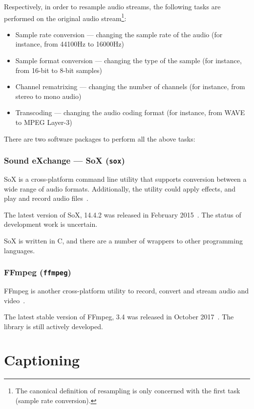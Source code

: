 Respectively, in order to resample audio streams, the following tasks
are performed on the original audio stream\footnote{The canonical
definition of resampling is only concerned with the first task
(sample rate conversion).}:

\begin{itemize}
    \item Sample rate conversion --- changing the sample rate of the audio
    (for instance, from 44100Hz to 16000Hz)
    \item Sample format conversion --- changing the type of the sample
    (for instance, from 16-bit to 8-bit samples)
    \item Channel rematrixing --- changing the number of channels
    (for instance, from stereo to mono audio)
    \item Transcoding --- changing the audio coding format (for instance,
    from WAVE to MPEG Layer-3)
\end{itemize}

There are two software packages to perform all the above tasks:

\subsubsection{Sound eXchange --- SoX (\texttt{sox})}

SoX is a cross-platform command line utility that supports conversion
between a wide range of audio formats. Additionally, the utility could
apply effects, and play and record audio files~\cite{sox-docs}.

The latest version of SoX, 14.4.2 was released in February
2015~\cite{sox-cl}. The status of development work is uncertain.

SoX is written in C, and there are a number of wrappers to other
programming languages.

\subsubsection{FFmpeg (\texttt{ffmpeg})}

FFmpeg is another cross-platform utility to record, convert and stream
audio and video~\cite{ffmpeg}.

The latest stable version of FFmpeg, 3.4 was released in October
2017~\cite{ffmpeg-dl}. The library is still actively developed.

\section{Captioning}